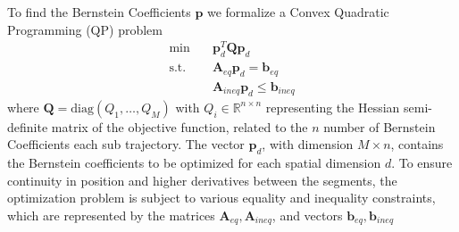 To find the Bernstein Coefficients $\mathbf{p}$ we formalize  a Convex Quadratic Programming (QP) problem \cite{mao2023robust}
\begin{equation}
\begin{aligned}
\text{min} \quad & \mathbf{p}_d^T\mathbf{Q} \mathbf{p}_d\\
\text{s.t.} \quad & \mathbf{A}_{eq}\mathbf{p}_d = \mathbf{b}_{eq} \\
& \mathbf{A}_{ineq}\mathbf{p}_d \le  \mathbf{b}_{ineq}
\end{aligned}
\end{equation}
where $\mathbf{Q} = \text{diag}(Q_1, \hdots, Q_M)$ with $Q_i \in \mathbb{R}^{n \times n}$ representing the Hessian semi-definite matrix of the objective function, related to the $n$ number of Bernstein Coefficients each sub trajectory. The vector $\mathbf{p}_d$, with dimension $M \times n$, contains the Bernstein coefficients to be optimized for each spatial dimension $d$. To ensure continuity in position and higher derivatives between the segments, the optimization problem is subject to various equality and inequality constraints, which are represented by the matrices $\mathbf{A}_{eq}, \mathbf{A}_{ineq}$, and vectors $\mathbf{b}_{eq}, \mathbf{b}_{ineq}$




